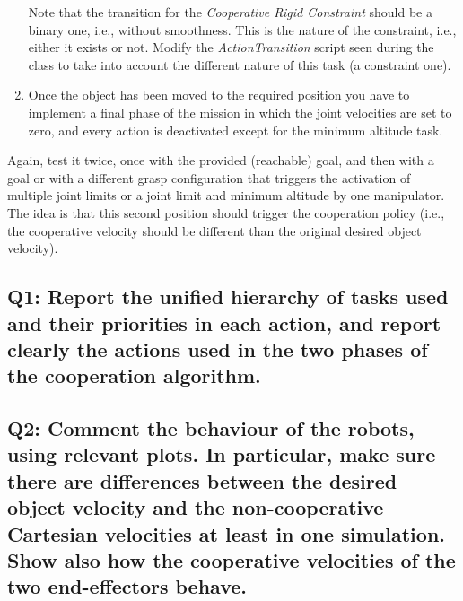 \documentclass{article}
\begin{document}
\begin{enumerate}
Note that the transition for the \textit{Cooperative Rigid Constraint} should be a binary one, i.e., without smoothness. This is the nature of the constraint, i.e., either it exists or not. Modify the \emph{ActionTransition} script seen during the class to take into account the different nature of this task (a constraint one).

\item Once the object has been moved to the required position you have to implement a final phase of the mission in which the joint velocities are set to zero, and every action is deactivated except for the minimum altitude task.
\end{enumerate}

 Again, test it twice, once with the provided (reachable) goal, and then with a goal or with a different grasp configuration that triggers the activation of multiple joint limits or a joint limit and minimum altitude by one manipulator. The idea is that this second position should trigger the cooperation policy (i.e., the cooperative velocity should be different than the original desired object velocity).

\subsection{Q1: Report the unified hierarchy of tasks used and their priorities in each action, and report clearly the actions used in the two phases of the cooperation algorithm.}

\subsection{Q2: Comment the behaviour of the robots, using relevant plots. In particular, make sure there are differences between the desired object velocity and the non-cooperative Cartesian velocities at least in one simulation. Show also how the cooperative velocities of the two end-effectors behave.}



		
\clearpage
\end{document}
